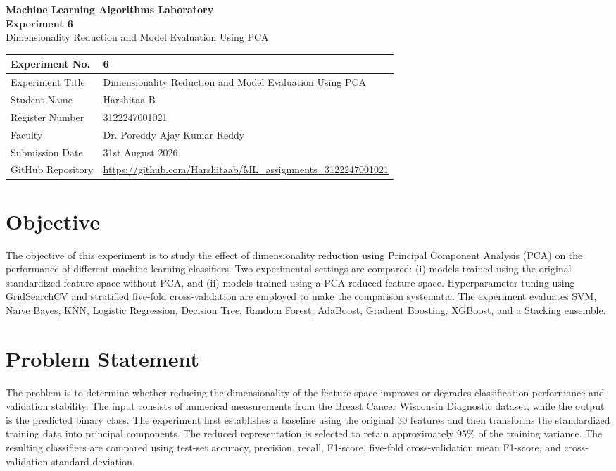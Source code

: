 \documentclass[12pt,a4paper]{article}
\begin{document}
\begin{center}
{\Large\bfseries Machine Learning Algorithms Laboratory}\\[0.4cm]
{\large\bfseries Experiment 6}\\[0.2cm]
{\large Dimensionality Reduction and Model Evaluation Using PCA}
\end{center}

\vspace{0.4cm}
\begin{tabular}{|p{4cm}|p{11cm}|}
\hline
Experiment No. & 6 \\ \hline
Experiment Title & Dimensionality Reduction and Model Evaluation Using PCA \\ \hline
Student Name & Harshitaa B{\hspace{9cm}} \\ \hline
Register Number & 3122247001021{\hspace{9cm}} \\ \hline
Faculty & Dr. Poreddy Ajay Kumar Reddy \\ \hline
Submission Date & 31st August 2026{\hspace{9cm}} \\ \hline
GitHub Repository & \url{https://github.com/Harshitaab/ML_assignments_3122247001021} \\ \hline
\end{tabular}

\section{Objective}
The objective of this experiment is to study the effect of dimensionality reduction using Principal Component Analysis (PCA) on the performance of different machine-learning classifiers. Two experimental settings are compared: (i) models trained using the original standardized feature space without PCA, and (ii) models trained using a PCA-reduced feature space. Hyperparameter tuning using GridSearchCV and stratified five-fold cross-validation are employed to make the comparison systematic. The experiment evaluates SVM, Na\"ive Bayes, KNN, Logistic Regression, Decision Tree, Random Forest, AdaBoost, Gradient Boosting, XGBoost, and a Stacking ensemble.

\section{Problem Statement}
The problem is to determine whether reducing the dimensionality of the feature space improves or degrades classification performance and validation stability. The input consists of numerical measurements from the Breast Cancer Wisconsin Diagnostic dataset, while the output is the predicted binary class. The experiment first establishes a baseline using the original 30 features and then transforms the standardized training data into principal components. The reduced representation is selected to retain approximately 95\% of the training variance. The resulting classifiers are compared using test-set accuracy, precision, recall, F1-score, five-fold cross-validation mean F1-score, and cross-validation standard deviation.
\end{document}
